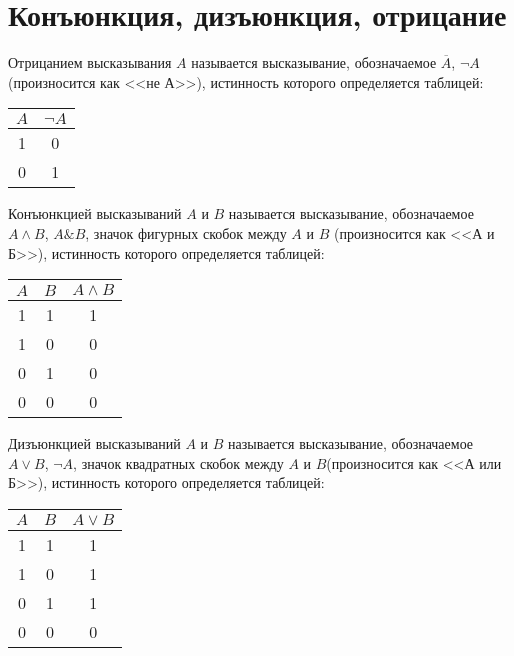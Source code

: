 \section{Конъюнкция, дизъюнкция, отрицание}

\begin{definition}[Отрицание]
	Отрицанием высказывания $A$ называется высказывание, обозначаемое $\overline A$, $\neg A$ (произносится как <<не А>>), истинность которого определяется таблицей:
	\begin{center}
		\begin{tabular}{ |c|c| } 
			\hline
			$A$ & $\neg A$ \\
			\hline 
			1 & 0 \\ 
			0 & 1 \\ 
			\hline
		\end{tabular}
	\end{center}
\end{definition}

\begin{definition}[Конъюнкция]
	Конъюнкцией высказываний $A$ и $B$ называется высказывание, обозначаемое $A \land B$, $A \& B$, значок фигурных скобок между $A$ и $B$ (произносится как <<А и Б>>), истинность которого определяется таблицей:
	\begin{center}
		\begin{tabular}{ |c|c|c| } 
			\hline
			$A$ & $B$ & $A \land B$ \\
			\hline 
			1 & 1 & 1 \\ 
			1 & 0 & 0 \\
			0 & 1 & 0 \\ 
			0 & 0 & 0 \\  
			\hline
		\end{tabular}
	\end{center}
\end{definition}

\begin{definition}[Дизъюнкция]
	Дизъюнкцией высказываний  $A$ и $B$ называется высказывание, обозначаемое $A \lor B$, $\neg A$, значок квадратных скобок между $A$ и $B$(произносится как <<А или Б>>), истинность которого определяется таблицей:
	\begin{center}
		\begin{tabular}{ |c|c|c| } 
			\hline
			$A$ & $B$ & $A \lor B$ \\
			\hline 
			1 & 1 & 1 \\ 
			1 & 0 & 1 \\
			0 & 1 & 1 \\ 
			0 & 0 & 0 \\  
			\hline
		\end{tabular}
	\end{center}
\end{definition}


